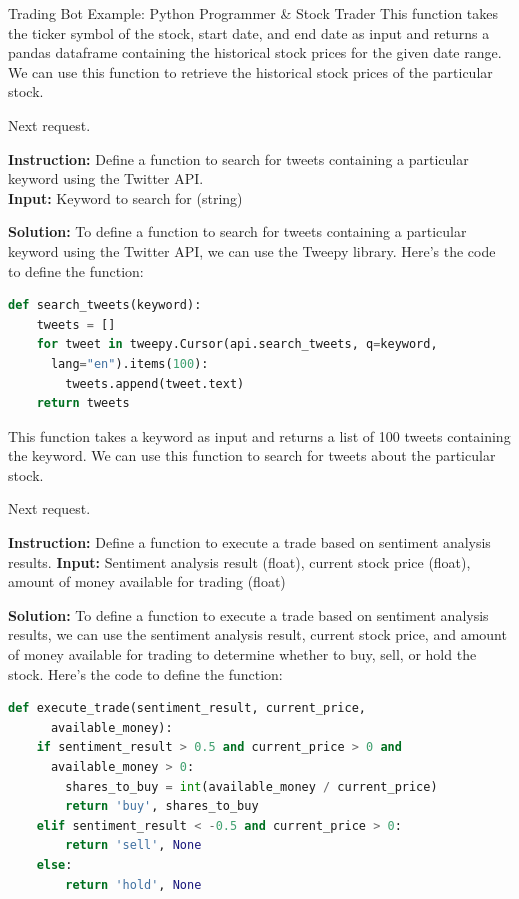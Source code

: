 \begin{AIBoxBreak}{Trading Bot Example: Python Programmer \& Stock Trader}
	This function takes the ticker symbol of the stock, start date, and end date as input and returns a pandas dataframe containing the historical stock prices for the given date range. We can use this function to retrieve the historical stock prices of the particular stock.

	Next request.\\

	\usermsg

	\textbf{Instruction:} Define a function to search for tweets containing a particular keyword using the Twitter API.\\
	\textbf{Input:} Keyword to search for (string)\\

	\assistantmsg

	\textbf{Solution:} To define a function to search for tweets containing a particular keyword using the Twitter API, we can use the Tweepy library. Here's the code to define the function:

	\begin{lstlisting}[language=Python]
def search_tweets(keyword):
    tweets = []
    for tweet in tweepy.Cursor(api.search_tweets, q=keyword, 
      lang="en").items(100):
        tweets.append(tweet.text)
    return tweets
\end{lstlisting}

	This function takes a keyword as input and returns a list of 100 tweets containing the keyword. We can use this function to search for tweets about the particular stock.

	Next request.\\

	\usermsg

	\textbf{Instruction:} Define a function to execute a trade based on sentiment analysis results.
	\textbf{Input:} Sentiment analysis result (float), current stock price (float), amount of money available for trading (float)\\

	\assistantmsg

	\textbf{Solution:} To define a function to execute a trade based on sentiment analysis results, we can use the sentiment analysis result, current stock price, and amount of money available for trading to determine whether to buy, sell, or hold the stock. Here's the code to define the function:

	\begin{lstlisting}[language=Python]
def execute_trade(sentiment_result, current_price,
      available_money):
    if sentiment_result > 0.5 and current_price > 0 and 
      available_money > 0:
        shares_to_buy = int(available_money / current_price)
        return 'buy', shares_to_buy
    elif sentiment_result < -0.5 and current_price > 0:
        return 'sell', None
    else:
        return 'hold', None
\end{lstlisting}



\end{AIBoxBreak}
